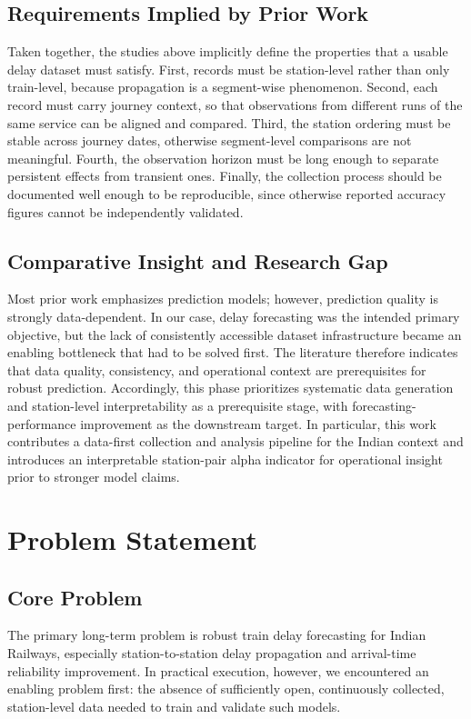 \documentclass[conference]{IEEEtran}
\begin{document}
\subsection{Requirements Implied by Prior Work}
Taken together, the studies above implicitly define the properties that a usable delay dataset must satisfy. First, records must be station-level rather than only train-level, because propagation is a segment-wise phenomenon. Second, each record must carry journey context, so that observations from different runs of the same service can be aligned and compared. Third, the station ordering must be stable across journey dates, otherwise segment-level comparisons are not meaningful. Fourth, the observation horizon must be long enough to separate persistent effects from transient ones. Finally, the collection process should be documented well enough to be reproducible, since otherwise reported accuracy figures cannot be independently validated.

\subsection{Comparative Insight and Research Gap}
Most prior work emphasizes prediction models; however, prediction quality is strongly data-dependent. In our case, delay forecasting was the intended primary objective, but the lack of consistently accessible dataset infrastructure became an enabling bottleneck that had to be solved first. The literature therefore indicates that data quality, consistency, and operational context are prerequisites for robust prediction. Accordingly, this phase prioritizes systematic data generation and station-level interpretability as a prerequisite stage, with forecasting-performance improvement as the downstream target. In particular, this work contributes a data-first collection and analysis pipeline for the Indian context and introduces an interpretable station-pair alpha indicator for operational insight prior to stronger model claims.

\section{Problem Statement}
\label{sec:problem}

\subsection{Core Problem}
The primary long-term problem is robust train delay forecasting for Indian Railways, especially station-to-station delay propagation and arrival-time reliability improvement. In practical execution, however, we encountered an enabling problem first: the absence of sufficiently open, continuously collected, station-level data needed to train and validate such models.
\end{document}
